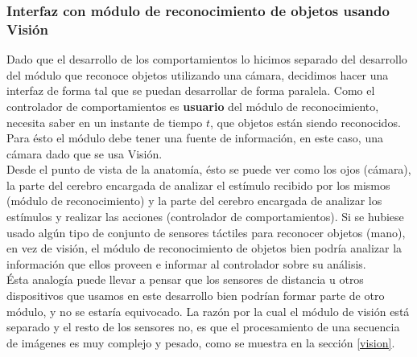 \subsubsection{Interfaz con m\'odulo de reconocimiento de objetos usando
Visi\'on}
Dado que el desarrollo de los comportamientos lo hicimos separado del
desarrollo del m\'odulo que reconoce objetos utilizando una c\'amara, decidimos
hacer una interfaz de forma tal que se puedan desarrollar de forma paralela.
Como el controlador de comportamientos es \textbf{usuario} del m\'odulo de
reconocimiento, necesita saber en un instante de tiempo $t$, que objetos
est\'an siendo reconocidos. Para \'esto el m\'odulo debe tener una fuente de
informaci\'on, en este caso, una c\'amara dado que se usa Visi\'on.
\\
Desde el punto de vista de la anatom\'ia, \'esto se puede ver como los ojos
(c\'amara), la parte del cerebro encargada de analizar el est\'imulo recibido
por los mismos (m\'odulo de reconocimiento) y la parte del cerebro encargada de
analizar los est\'imulos y realizar las acciones (controlador de
comportamientos). Si se hubiese usado alg\'un tipo de conjunto de sensores
t\'actiles para reconocer objetos (mano), en vez de visi\'on, el m\'odulo de
reconocimiento de objetos bien podr\'ia analizar la informaci\'on que ellos
proveen e informar al controlador sobre su an\'alisis.
\\
\'Esta analog\'ia puede llevar a pensar que los sensores de distancia u otros
dispositivos que usamos en este desarrollo bien podr\'ian formar parte de otro
m\'odulo, y no se estar\'ia equivocado. La raz\'on por la cual el m\'odulo de
visi\'on est\'a separado y el resto de los sensores no, es que el procesamiento
de una secuencia de im\'agenes es muy complejo y pesado, como se muestra en la
secci\'on \ref{vision}.

\newpage
